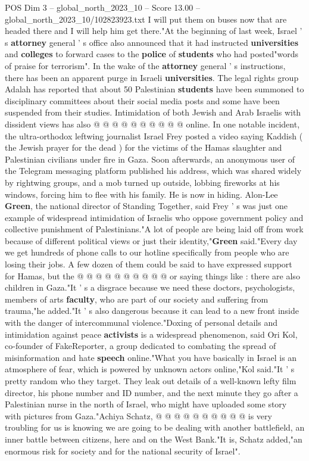 \begin{textsample}{POS Dim 3 – global\_north\_2023\_10 – Score 13.00 – global\_north\_2023\_10/102823923.txt}
I will put them on buses now that are headed there and I will help him get there."At the beginning of last week, Israel ' s \textbf{attorney} general ' s office also announced that it had instructed \textbf{universities} and \textbf{colleges} to forward cases to the \textbf{police} of \textbf{students} who had posted"words of praise for terrorism".
In the wake of the \textbf{attorney} general ' s instructions, there has been an apparent purge in Israeli \textbf{universities}.
The legal rights group Adalah has reported that about 50 Palestinian \textbf{students} have been summoned to disciplinary committees about their social media posts and some have been suspended from their studies.
Intimidation of both Jewish and Arab Israelis with dissident views has also @ @ @ @ @ @ @ @ @ @ online.
In one notable incident, the ultra-orthodox leftwing journalist Israel Frey posted a video saying Kaddish ( the Jewish prayer for the dead ) for the victims of the Hamas slaughter and Palestinian civilians under fire in Gaza.
Soon afterwards, an anonymous user of the Telegram messaging platform published his address, which was shared widely by rightwing groups, and a mob turned up outside, lobbing fireworks at his windows, forcing him to flee with his family.
He is now in hiding.
Alon-Lee \textbf{Green}, the national director of Standing Together, said Frey ' s was just one example of widespread intimidation of Israelis who oppose government policy and collective punishment of Palestinians."A lot of people are being laid off from work because of different political views or just their identity,"\textbf{Green} said."Every day we get hundreds of phone calls to our hotline specifically from people who are losing their jobs.
A few dozen of them could be said to have expressed support for Hamas, but the @ @ @ @ @ @ @ @ @ @ or saying things like : there are also children in Gaza."It ' s a disgrace because we need these doctors, psychologists, members of arts \textbf{faculty}, who are part of our society and suffering from trauma,"he added."It ' s also dangerous because it can lead to a new front inside with the danger of intercommunal violence."Doxing of personal details and intimidation against peace \textbf{activists} is a widespread phenomenon, said Ori Kol, co-founder of FakeReporter, a group dedicated to combating the spread of misinformation and hate \textbf{speech} online."What you have basically in Israel is an atmosphere of fear, which is powered by unknown actors online,"Kol said."It ' s pretty random who they target.
They leak out details of a well-known lefty film director, his phone number and ID number, and the next minute they go after a Palestinian nurse in the north of Israel, who might have uploaded some story with pictures from Gaza."Achiya Schatz, @ @ @ @ @ @ @ @ @ @ is very troubling for us is knowing we are going to be dealing with another battlefield, an inner battle between citizens, here and on the West Bank."It is, Schatz added,"an enormous risk for society and for the national security of Israel".

\end{textsample}
